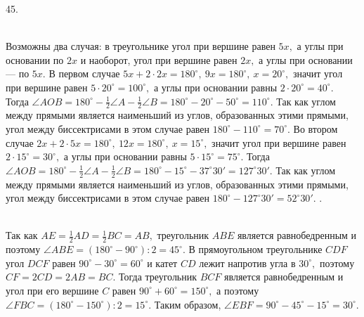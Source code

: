 45. \begin{figure}[ht!]
\end{figure}\\
Возможны два случая: в треугольнике угол при вершине равен $5x,$ а углы при основании по $2x$ и наоборот, угол при вершине равен $2x,$ а углы при основании --- по $5x.$ В первом случае $5x+2\cdot2x=180^\circ,\ 9x=180^\circ,\ x=20^\circ,$ значит угол при вершине равен $5\cdot20^\circ=100^\circ,$ а углы при основании равны $2\cdot20^\circ=40^\circ.$ Тогда $\angle AOB=180^\circ-\frac{1}{2}\angle A-\frac{1}{2}\angle B=180^\circ-20^\circ-50^\circ=110^\circ.$ Так как углом между прямыми является наименьший из углов, образованных этими прямыми, угол между биссектрисами в этом случае равен $180^\circ-110^\circ=70^\circ.$ Во втором случае $2x+2\cdot5x=180^\circ,\ 12x=180^\circ,\ x=15^\circ,$ значит угол при вершине равен $2\cdot15^\circ=30^\circ,$ а углы при основании равны $5\cdot15^\circ=75^\circ.$
Тогда $\angle AOB=180^\circ-\frac{1}{2}\angle A-\frac{1}{2}\angle B=180^\circ-15^\circ-37^\circ30'=127^\circ30'.$ Так как углом между прямыми является наименьший из углов, образованных этими прямыми, угол между биссектрисами в этом случае равен $180^\circ-127^\circ30'=52^\circ30'.$\newpage
{}. \begin{figure}[ht!]
\end{figure}\\
Так как $AE=\frac{1}{2}AD=\frac{1}{2}BC=AB,$ треугольник $ABE$ является равнобедренным и поэтому $\angle ABE=(180^\circ-90^\circ):2=45^\circ.$ В прямоугольном треугольнике $CDF$ угол $DCF$ равен $90^\circ-30^\circ=60^\circ$ и катет $CD$ лежит напротив угла в $30^\circ,$ поэтому $CF=2CD=2AB=BC.$ Тогда треугольник $BCF$ является равнобедренным и угол при его вершине $C$ равен $90^\circ+60^\circ=150^\circ,$ а поэтому $\angle FBC=(180^\circ-150^\circ):2=15^\circ.$ Таким образом, $\angle EBF=90^\circ-45^\circ-15^\circ=30^\circ.$\\
